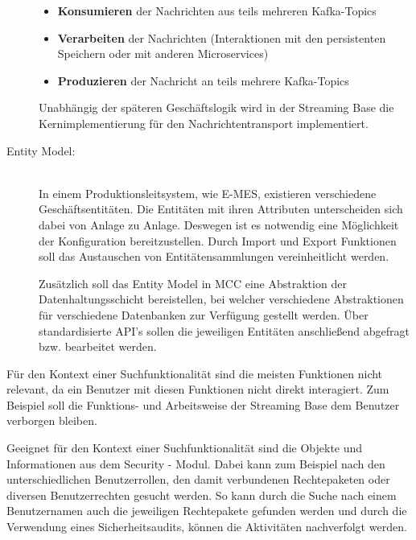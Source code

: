 \begin{description}
    \begin{itemize}
        \item \textbf{Konsumieren} der Nachrichten aus teils mehreren Kafka-Topics
        \item \textbf{Verarbeiten} der Nachrichten (Interaktionen mit den persistenten Speichern oder mit anderen Microservices)
        \item \textbf{Produzieren} der Nachricht an teils mehrere Kafka-Topics
    \end{itemize}

    Unabhängig der späteren Geschäftslogik wird in der \glqq Streaming Base\grqq{} die Kernimplementierung für den Nachrichtentransport implementiert.
    
    \item[Entity Model:]\hfill \\
    In einem Produktionsleitsystem, wie \glqq E-MES\grqq{}, existieren verschiedene Geschäftsentitäten. Die Entitäten mit ihren Attributen unterscheiden sich dabei von Anlage zu Anlage. Deswegen ist es notwendig eine Möglichkeit der Konfiguration bereitzustellen. Durch Import und Export Funktionen soll das Austauschen von Entitätensammlungen vereinheitlicht werden.

    Zusätzlich soll das Entity Model in MCC eine Abstraktion der Datenhaltungsschicht bereistellen, bei welcher verschiedene Abstraktionen für verschiedene Datenbanken zur Verfügung gestellt werden. Über standardisierte API's sollen die jeweiligen Entitäten anschließend abgefragt bzw. bearbeitet werden.

\end{description}

Für den Kontext einer Suchfunktionalität sind die meisten Funktionen nicht relevant, da ein Benutzer mit diesen Funktionen nicht direkt interagiert. Zum Beispiel soll die Funktions- und Arbeitsweise der \glqq Streaming Base\grqq{} dem Benutzer verborgen bleiben.

Geeignet für den Kontext einer Suchfunktionalität sind die Objekte und Informationen aus dem \glqq Security\grqq{} - Modul. Dabei kann zum Beispiel nach den unterschiedlichen Benutzerrollen, den damit verbundenen Rechtepaketen oder diversen Benutzerrechten gesucht werden. So kann durch die Suche nach einem Benutzernamen auch die jeweiligen Rechtepakete gefunden werden und durch die Verwendung eines Sicherheitsaudits, können die Aktivitäten nachverfolgt werden.


